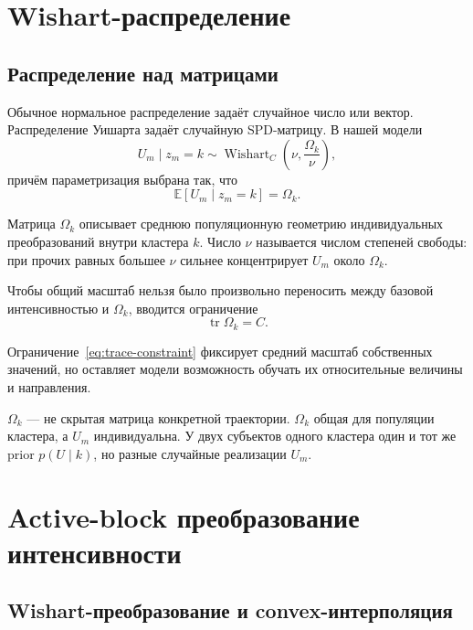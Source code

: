 \documentclass[12pt,a4paper]{article}
\DeclareMathOperator{\tr}{tr}
\DeclareMathOperator{\Wishart}{Wishart}
\newcommand{\E}{\mathbb{E}}
\newenvironment{warningbox}{\par\medskip\noindent{\color{red}\bfseries Важно не перепутать. }\ignorespaces}{\par\medskip}
\begin{document}
\section{Wishart-распределение}

\subsection{Распределение над матрицами}

Обычное нормальное распределение задаёт случайное число или вектор. Распределение Уишарта задаёт случайную SPD-матрицу. В нашей модели
\begin{equation}
U_m\mid z_m=k\sim\Wishart_C\!\left(\nu,\frac{\Omega_k}{\nu}\right),
\label{eq:wishart-prior}
\end{equation}
причём параметризация выбрана так, что
\begin{equation}
\E[U_m\mid z_m=k]=\Omega_k.
\end{equation}

Матрица \(\Omega_k\) описывает среднюю популяционную геометрию индивидуальных преобразований внутри кластера \(k\). Число \(\nu\) называется числом степеней свободы: при прочих равных большее \(\nu\) сильнее концентрирует \(U_m\) около \(\Omega_k\).

Чтобы общий масштаб нельзя было произвольно переносить между базовой интенсивностью и \(\Omega_k\), вводится ограничение
\begin{equation}
\tr\Omega_k=C.
\label{eq:trace-constraint}
\end{equation}

Ограничение~\eqref{eq:trace-constraint} фиксирует средний масштаб собственных значений, но оставляет модели возможность обучать их относительные величины и направления.

\begin{warningbox}
\(\Omega_k\) --- не скрытая матрица конкретной траектории. \(\Omega_k\) общая для популяции кластера, а \(U_m\) индивидуальна. У двух субъектов одного кластера один и тот же prior \(p(U\mid k)\), но разные случайные реализации \(U_m\).
\end{warningbox}

\section{Active-block преобразование интенсивности}

\subsection{Wishart-преобразование и convex-интерполяция}
\end{document}

